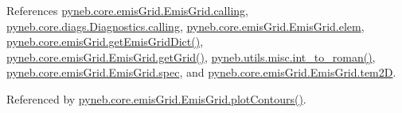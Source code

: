 References \hyperlink{emis_grid_8py_source_l00041}{pyneb.\+core.\+emis\+Grid.\+Emis\+Grid.\+calling}, \hyperlink{diags_8py_source_l00169}{pyneb.\+core.\+diags.\+Diagnostics.\+calling}, \hyperlink{emis_grid_8py_source_l00045}{pyneb.\+core.\+emis\+Grid.\+Emis\+Grid.\+elem}, \hyperlink{emis_grid_8py_source_l00312}{pyneb.\+core.\+emis\+Grid.\+get\+Emis\+Grid\+Dict()}, \hyperlink{emis_grid_8py_source_l00111}{pyneb.\+core.\+emis\+Grid.\+Emis\+Grid.\+get\+Grid()}, \hyperlink{misc_8py_source_l00013}{pyneb.\+utils.\+misc.\+int\+\_\+to\+\_\+roman()}, \hyperlink{emis_grid_8py_source_l00046}{pyneb.\+core.\+emis\+Grid.\+Emis\+Grid.\+spec}, and \hyperlink{emis_grid_8py_source_l00088}{pyneb.\+core.\+emis\+Grid.\+Emis\+Grid.\+tem2\+D}.



Referenced by \hyperlink{emis_grid_8py_source_l00179}{pyneb.\+core.\+emis\+Grid.\+Emis\+Grid.\+plot\+Contours()}.


